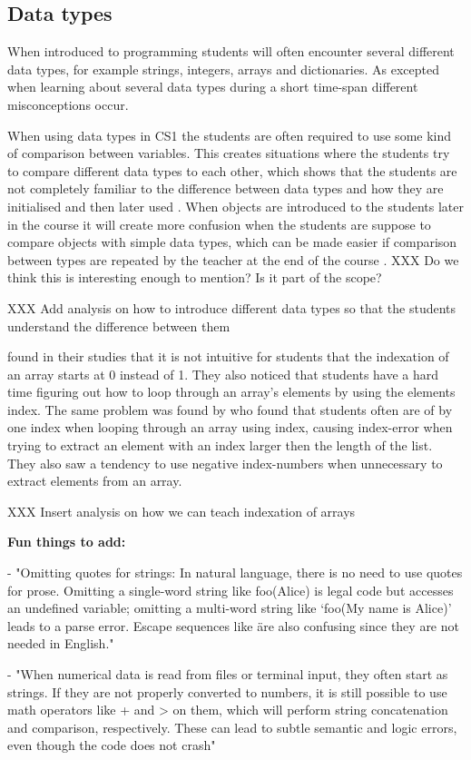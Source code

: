 \subsection{Data types}

When introduced to programming students will often encounter several 
different data types, for example strings, integers, arrays and dictionaries. 
As excepted when learning about several data types during a short time-span 
different misconceptions occur. 

When using data types in CS1 the students are often required to use some kind 
of comparison between variables. This creates situations where the students 
try to compare different data types to each other, which shows that the 
students are not completely familiar to the difference between data types and 
how they are initialised and then later used \parencite{Kurvinen2016}. When 
objects are introduced to the students later in the course it will create 
more confusion when the students are suppose to compare objects with simple 
data types, which can be made easier if comparison between types are repeated 
by the teacher at the end of the course \parencite{Kurvinen2016}. XXX Do we 
think this is interesting enough to mention? Is it part of the scope?

XXX Add analysis on how to introduce different data types so that the 
students understand the difference between them


 \textcite{Kurvinen2016} found in their studies that it is not intuitive for 
students that the indexation of an array starts at 0 instead of 1. They also 
noticed that students have a hard time figuring out how to loop through an 
array's elements by using the elements index. The same problem was found by 
\textcite{KumarVeerasamy2016} who found that students often are of by one 
index when looping through an array using index, causing index-error when 
trying to extract an element with an index larger then the length of the 
list. They also saw a tendency to use negative index-numbers when 
unnecessary to extract elements from an array.

 XXX Insert analysis on how we can teach indexation of arrays


\textbf{Fun things to add:}

- "Omitting quotes for strings: In natural language, there is no need to use 
quotes for prose. Omitting a single-word string like foo(Alice) is legal code 
but accesses an undefined variable; omitting a multi-word string like ‘foo(My 
name is Alice)’ leads to a parse error. Escape sequences like \" are also 
confusing since they are not needed in English." \parencite{GuoMarkelZhang2020}

- "When numerical data is read from files or terminal input, they often start 
as strings. If they are not properly converted to numbers, it is still 
possible to use math operators like + and > on them, which will perform 
string concatenation and comparison, respectively. These can lead to subtle 
semantic and logic errors, even though the code does not crash" \parencite{
GuoMarkelZhang2020}